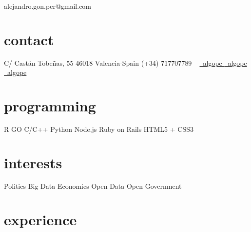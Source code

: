 \documentclass[]{friggeri-cv}
\begin{document}
       {alejandro.gon.per@gmail.com}


\begin{aside}
    \section{contact}
        C/ Castán Tobeñas, 55
        46018 Valencia-Spain
        (+34) 717707789
        ~
        \href{https://www.linkedin.com/in/algope}{\faLinkedin\ algope } 
        \href{http://github.com/algope}{\faGithub\ algope}
        \href{http://twitter.com/algope_}{\faTwitter\ algope}
    \section{programming}
        R
        GO
        C/C++
        Python
        Node.js
        Ruby on Rails
        HTML5 + CSS3
    \section{interests}
        Politics
        Big Data
        Economics
        Open Data
        Open Government
\end{aside}


\section{experience}
\end{document}
